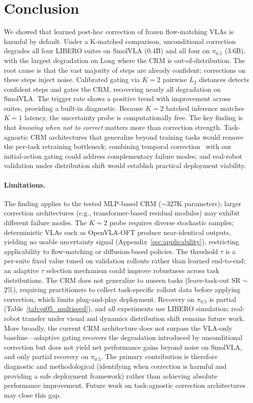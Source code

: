 
\section{Conclusion}
\label{sec:conclusion}

 We showed that learned post-hoc correction of frozen flow-matching VLAs is harmful by default. Under a K-matched comparison, unconditional correction degrades all four LIBERO suites on SmolVLA (0.4B) and all four on $\pi_{0.5}$ (3.6B), with the largest degradation on Long where the CRM is out-of-distribution. The root cause is that the vast majority of steps are already confident; corrections on these steps inject noise. Calibrated gating via $K{=}2$ pairwise $L_2$ distances detects confident steps and gates the CRM, recovering nearly all degradation on SmolVLA. The trigger rate shows a positive trend with improvement across suites, providing a built-in diagnostic. Because $K{=}2$ batched inference matches $K{=}1$ latency, the uncertainty probe is computationally free. The key finding is that \emph{knowing when not to correct} matters more than correction strength.
Task-agnostic CRM architectures that generalize beyond training tasks would remove the per-task retraining bottleneck; combining temporal correction~\cite{a2c2_2025} with our initial-action gating could address complementary failure modes; and real-robot validation under distribution shift would establish practical deployment viability.

\paragraph{Limitations.}
\label{sec:limitations}
 The finding applies to the tested MLP-based CRM (${\sim}$327K parameters); larger correction architectures (e.g., transformer-based residual modules) may exhibit different failure modes. The $K{=}2$ probe requires diverse stochastic samples; deterministic VLAs such as OpenVLA-OFT produce near-identical outputs, yielding no usable uncertainty signal (Appendix~\ref{sec:applicability}), restricting applicability to flow-matching or diffusion-based policies. The threshold $\tau$ is a per-suite fixed value tuned on validation rollouts rather than learned end-to-end; an adaptive $\tau$ selection mechanism could improve robustness across task distributions. The CRM does not generalize to unseen tasks (leave-task-out SR ${\sim}$2\%), requiring practitioners to collect task-specific rollout data before applying correction, which limits plug-and-play deployment. Recovery on $\pi_{0.5}$ is partial (Table~\ref{tab:pi05_multiseed}), and all experiments use LIBERO simulation; real-robot transfer under visual and dynamics distribution shift remains future work. More broadly, the current CRM architecture does not surpass the VLA-only baseline---adaptive gating recovers the degradation introduced by unconditional correction but does not yield net performance gains beyond noise on SmolVLA, and only partial recovery on $\pi_{0.5}$. The primary contribution is therefore diagnostic and methodological (identifying when correction is harmful and providing a safe deployment framework) rather than achieving absolute performance improvement. Future work on task-agnostic correction architectures may close this gap.
